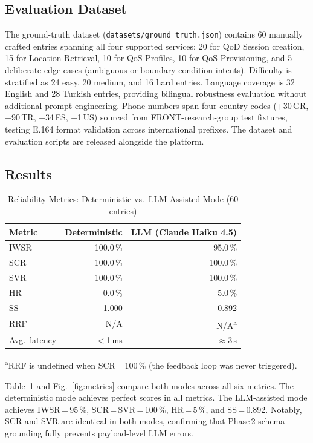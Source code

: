 \documentclass[conference]{IEEEtran}
\begin{document}
\subsection{Evaluation Dataset}

The ground-truth dataset (\texttt{datasets/ground\_truth.json}) contains
60 manually crafted entries spanning all four supported services:
20 for QoD Session creation, 15 for Location Retrieval,
10 for QoS Profiles, 10 for QoS Provisioning,
and 5 deliberate edge cases (ambiguous or boundary-condition intents).
Difficulty is stratified as 24 easy, 20 medium, and 16 hard entries.
Language coverage is 32 English and 28 Turkish entries, providing
bilingual robustness evaluation without additional prompt engineering.
Phone numbers span four country codes (+30\,GR, +90\,TR, +34\,ES, +1\,US)
sourced from FRONT-research-group test fixtures, testing E.164 format
validation across international prefixes.
The dataset and evaluation scripts are released alongside the platform.

\subsection{Results}

\begin{table}[t]
\centering
\caption{Reliability Metrics: Deterministic vs.\ LLM-Assisted Mode (60 entries)}
\label{tab:results}
\small
\begin{tabular}{lrr}
\toprule
\textbf{Metric} & \textbf{Deterministic} & \textbf{LLM (Claude Haiku 4.5)} \\
\midrule
IWSR  & 100.0\,\% &  95.0\,\% \\
SCR   & 100.0\,\% & 100.0\,\% \\
SVR   & 100.0\,\% & 100.0\,\% \\
HR    &   0.0\,\% &   5.0\,\% \\
SS    &    1.000  &    0.892  \\
RRF   &    N/A    &    N/A\textsuperscript{a} \\
Avg.\ latency & $<$1\,ms & $\approx$3\,s \\
\bottomrule
\end{tabular}
\vspace{2pt}

\noindent\footnotesize\textsuperscript{a}RRF is undefined when
SCR\,=\,100\,\% (the feedback loop was never triggered).
\end{table}

Table~\ref{tab:results} and Fig.~\ref{fig:metrics} compare both modes
across all six metrics.
The deterministic mode achieves perfect scores in all metrics.
The LLM-assisted mode achieves IWSR\,=\,95\,\%,
SCR\,=\,SVR\,=\,100\,\%, HR\,=\,5\,\%, and SS\,=\,0.892.
Notably, SCR and SVR are identical in both modes, confirming that
Phase\,2 schema grounding fully prevents payload-level LLM errors.
\end{document}
